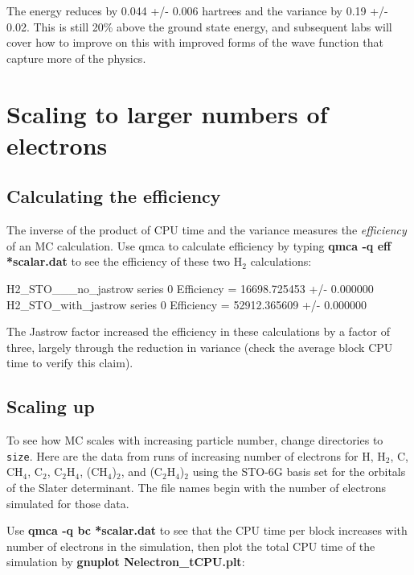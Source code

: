 The energy reduces by 0.044 +/- 0.006 hartrees and the variance by 0.19 +/- 0.02.
This is still 20\% above the ground state energy, and subsequent labs will cover how
to improve on this with improved forms of the wave function that capture more
of the physics.

\section{Scaling to larger numbers of electrons}

\subsection{Calculating the efficiency}

The inverse of the product of CPU time and the variance measures the
\textit{efficiency} of an MC calculation.  Use qmca to calculate efficiency by
typing \textbf{qmca -q eff *scalar.dat} to see the efficiency of these two
H$_2$ calculations:

\begin{shade}
H2_STO___no_jastrow  series 0  Efficiency = 16698.725453 +/- 0.000000 
H2_STO_with_jastrow  series 0  Efficiency = 52912.365609 +/- 0.000000 
\end{shade}

The Jastrow factor increased the efficiency in these calculations by a factor
of three, largely through the reduction in variance (check the average block
CPU time to verify this claim).

\subsection{Scaling up}

To see how MC scales with increasing particle number, change directories to
\texttt{size}.  Here are the data from runs of increasing number of electrons
for H, H$_2$, C, CH$_4$, C$_2$, C$_2$H$_4$, (CH$_4$)$_2$, and (C$_2$H$_4$)$_2$
using the STO-6G basis set for the orbitals of the Slater determinant.  The file names begin with the number of electrons simulated for those data.

Use \textbf{qmca -q bc *scalar.dat} to see that the CPU time per block
increases with number of electrons in the simulation, then plot the total CPU
time of the simulation by \textbf{gnuplot Nelectron\_tCPU.plt}:

